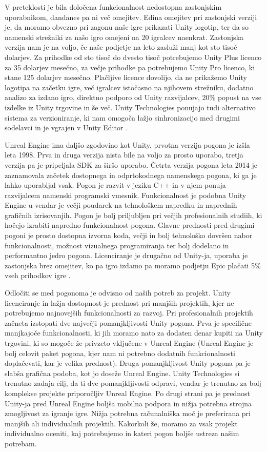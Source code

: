 \documentclass[12pt,a4paper,twoside]{book}
\begin{document}
V preteklosti je bila določena funkcionalnost nedostopna zastonjskim uporabnikom, dandanes pa ni več omejitev. Edina omejitev pri zastonjski verziji je, da moramo obvezno pri zagonu naše igre prikazati Unity logotip, ter da so namenski strežniki za našo igro omejeni na 20 igralcev naenkrat. Zastonjska verzija nam je na voljo, če naše podjetje na leto zasluži manj kot sto tisoč dolarjev. Za prihodke od sto tisoč do dvesto tisoč potrebujemo Unity Plus licenco za 35 dolarjev mesečno, za večje prihodke pa potrebujemo Unity Pro licenco, ki stane 125 dolarjev mesečno. Plačljive licence dovolijo, da ne prikažemo Unity logotipa na začetku igre, več igralcev istočasno na njihovem strežniku, dodatno analizo za izdano igro, direktno podporo od Unity razvijalcev, 20\% popust na vse izdelke iz Unity trgovine in še več. Unity Technologies ponujajo tudi alternativo sistema za verzioniranje, ki nam omogoča lažjo sinhronizacijo med drugimi sodelavci in je vgrajen v Unity Editor \cite{unityFeatures}.

Unreal Engine ima daljšo zgodovino kot Unity, prvotna verzija pogona je izšla leta 1998. Prva in druga verzija nista bile na voljo za prosto uporabo, tretja verzija pa je pripeljala SDK za širšo uporabo. Četrta verzija pogona leta 2014 je zaznamovala začetek dostopnega in odprtokodnega namenskega pogona, ki ga je lahko uporabljal vsak. Pogon je razvit v jeziku C++ in v njem ponuja razvijalcem namenski programski vmesnik. Funkcionalnost je podobna Unity Engine-u vendar je večji poudarek na tehnološkem napredku in naprednih grafičnih izrisovanjih. Pogon je bolj priljubljen pri večjih profesionalnih studiih, ki hočejo izrabiti napredno funkcionalnost pogona. Glavne prednosti pred drugimi pogoni je prosto dostopna izvorna koda, večji in bolj tehnološko dovršen nabor funkcionalnosti, možnost vizualnega programiranja ter bolj dodelano in performantno jedro pogona. Licenciranje je drugačno od Unity-ja, uporaba je zastonjska brez omejitev, ko pa igro izdamo pa moramo podjetju Epic plačati 5\% vseh prihodkov igre \cite{unrealEngine}. 

Odločiti se med pogonoma je odvisno od naših potreb za projekt. Unity licenciranje in lažja dostopnost je prednost pri manjših projektih, kjer ne potrebujemo najnovejših funkcionalnosti za razvoj. Pri profesionalnih projektih začneta izstopati dve največji pomanjkljivosti Unity pogona. Prva je specifične manjkajoče funkcionalnosti, ki jih moramo nato za dodaten denar kupiti na Unity trgovini, ki so mogoče že privzeto vključene v Unreal Engine (Unreal Engine je bolj celovit paket pogona, kjer nam ni potrebno dodatnih funkcionalnosti doplačevati, kar je velika prednost). Druga pomanjkljivost Unity pogona pa je slabša grafična podoba, kot jo doseže Unreal Engine. Unity Technologies si trenutno zadaja cilj, da ti dve pomanjkljivosti odpravi, vendar je trenutno za bolj komplekse projekte priporočljiv Unreal Engine. Po drugi strani pa je prednost Unity-ja pred Unreal Engine boljša mobilna podpora in nižja potrebna strojna zmogljivost za igranje igre. Nižja potrebna računalniška moč je preferirana pri manjših ali individualnih projektih. Kakorkoli že, moramo za vsak projekt individualno oceniti, kaj potrebujemo in kateri pogon boljše ustreza našim potrebam.
\end{document}

